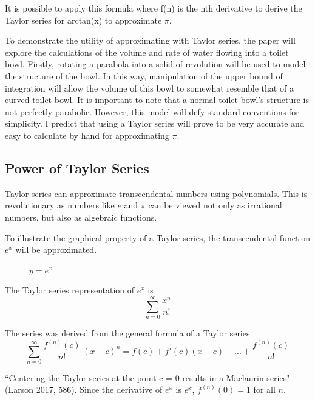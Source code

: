 \documentclass[12pt, titlepage]{article}
\begin{document}
It is possible to apply this formula where f(n) is the nth derivative to derive the Taylor series for arctan(x) to approximate \(\pi\).

To demonstrate the utility of approximating with Taylor series, the paper will explore the calculations of the volume and rate of water flowing into a toilet bowl. Firstly, rotating a parabola into a solid of revolution will be used to model the structure of the bowl. In this way, manipulation of the upper bound of integration will allow the volume of this bowl to somewhat resemble that of a curved toilet bowl. It is important to note that a normal toilet bowl's structure is not perfectly parabolic. However, this model will defy standard conventions for simplicity. I predict that using a Taylor series will prove to be very accurate and easy to calculate by hand for approximating \(\pi\). 

\subsection{Power of Taylor Series}
Taylor series can approximate transcendental numbers using polynomials. This is revolutionary as numbers like \(e\) and \(\pi\) can be viewed not only as irrational numbers, but also as algebraic functions.

To illustrate the graphical property of a Taylor series, the transcendental function \(e^{x}\) will be approximated.
\begin{figure}[H]
\centering
    \caption[]{\(y=e^x\)}
\end{figure}

The Taylor series representation of \(e^{x}\) is  
\begin{equation*}
  \sum_{n=0}^{\infty} \frac{x^{n}}{n!}
\end{equation*}

The series was derived from the general formula of a Taylor series.
\begin{equation*}
  \sum_{n=0}^{\infty} \frac{f^{(n)}(c)}{n!} \, (x-c)^{n} = f(c) + f'(c)(x-c) + ... +  \frac{f^{(n)}(c)}{n!}
\end{equation*}

``Centering the Taylor series at the point c = 0 results in a Maclaurin series" (Larson 2017, 586). Since the derivative of \(e^{x}\) is \(e^{x}\), \(f^{(n)}(0) = 1\) for all \(n\).
\end{document}
